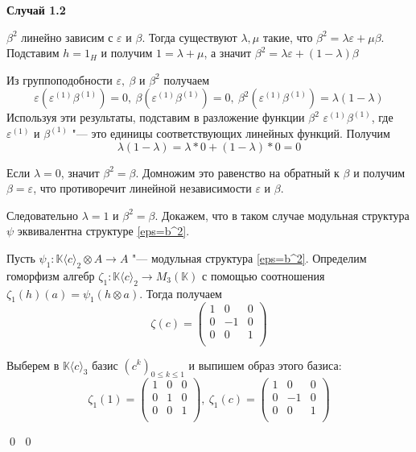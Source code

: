 \documentclass[12pt, reqno, a4paper, oneside, notitlepage]{amsart}
\makeatletter
\theoremstyle{mytheoremstyle}
\theoremstyle{myremarkstyle}
\numberwithin{equation}{section}
\renewenvironment{proof}[1][\proofname]{\par\indent {\bfseries #1\@addpunct{.} }}{\qed}
\makeatother
\begin{document}
\begin{proof}
\begin{proof}
    \textbf{Случай 1.2}
    
    $\beta^2$ линейно зависим с $\varepsilon$ и $\beta$. Тогда существуют $\lambda, \mu$ такие, что $\beta^2 = \lambda \varepsilon+\mu \beta$. Подставим $h = 1_H$ и получим $1 = \lambda+\mu$, а значит $\beta^2 = \lambda \varepsilon + (1 - \lambda)\beta$
    
    Из группоподобности $\varepsilon,\ \beta$ и $\beta^2$ получаем 
    \[
    \varepsilon(\varepsilon^{(1)}\beta^{(1)}) = 0,\ \beta(\varepsilon^{(1)}\beta^{(1)}) = 0,\ \beta^2(\varepsilon^{(1)}\beta^{(1)}) = \lambda(1-\lambda)
    \]
    Используя эти результаты, подставим в разложение функции $\beta^2$  $\varepsilon^{(1)}\beta^{(1)}$, где $\varepsilon^{(1)}$ и $\beta^{(1)}$ "--- это единицы соответствующих линейных функций. Получим 
    \[\lambda(1-\lambda) = \lambda*0 + (1-\lambda)*0 = 0\]

    Если $\lambda = 0$, значит $\beta^2 = \beta$. Домножим это равенство на обратный к $\beta$ и получим $\beta = \varepsilon$, что противоречит линейной независимости $\varepsilon$ и $\beta$.

    Следовательно $\lambda = 1$ и $\beta^2 = \beta$. Докажем, что в таком случае модульная структура $\psi$ эквивалентна структуре \ref{eps=b^2}.

    Пусть $\psi_1: \mathbb{K}\langle c\rangle_2 \otimes A \to A$ "--- модульная структура \ref{eps=b^2}.
    Определим гоморфизм алгебр $\zeta_1:\mathbb{K}\langle c\rangle_2 \to M_3(\mathbb{K})$ с помощью соотношения ${\zeta_1(h)(a)=\psi_1(h \otimes a)}$. Тогда получаем \[
    \zeta(c) = \begin{pmatrix}
        1 & 0 & 0\\
        0 & -1 & 0\\
        0 & 0 & 1\\
    \end{pmatrix}
    \]

    Выберем в $\mathbb{K}\langle c\rangle_3$  базис $(c^k)_{0 \leq k \leq 1}$ и выпишем образ этого базиса:
    \[
    \zeta_1(1) = \begin{pmatrix}
        1 & 0 & 0\\
        0 & 1 & 0\\
        0 & 0 & 1\\
    \end{pmatrix},\
    \zeta_1(c) = \begin{pmatrix}
        1 & 0 & 0\\
        0 & -1 & 0\\
        0 & 0 & 1\\
    \end{pmatrix}
    \]


\end{proof}
\end{proof}
\end{document}
